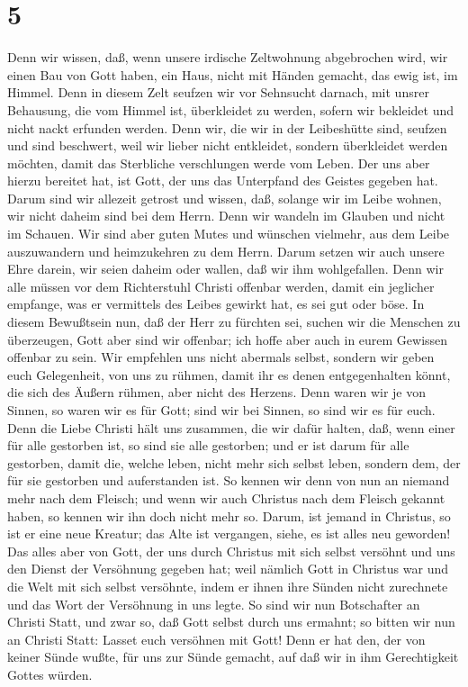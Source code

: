 \hypertarget{section-4}{%
\section{5}\label{section-4}}

 Denn wir wissen, daß, wenn unsere irdische Zeltwohnung
abgebrochen wird, wir einen Bau von Gott haben, ein Haus, nicht mit
Händen gemacht, das ewig ist, im Himmel.  Denn in diesem
Zelt seufzen wir vor Sehnsucht darnach, mit unsrer Behausung, die vom
Himmel ist, überkleidet zu werden,  sofern wir bekleidet
und nicht nackt erfunden werden.  Denn wir, die wir in der
Leibeshütte sind, seufzen und sind beschwert, weil wir lieber nicht
entkleidet, sondern überkleidet werden möchten, damit das Sterbliche
verschlungen werde vom Leben.  Der uns aber hierzu
bereitet hat, ist Gott, der uns das Unterpfand des Geistes gegeben hat.
 Darum sind wir allezeit getrost und wissen, daß, solange
wir im Leibe wohnen, wir nicht daheim sind bei dem Herrn. 
Denn wir wandeln im Glauben und nicht im Schauen.  Wir
sind aber guten Mutes und wünschen vielmehr, aus dem Leibe auszuwandern
und heimzukehren zu dem Herrn.  Darum setzen wir auch
unsere Ehre darein, wir seien daheim oder wallen, daß wir ihm
wohlgefallen.  Denn wir alle müssen vor dem Richterstuhl
Christi offenbar werden, damit ein jeglicher empfange, was er vermittels
des Leibes gewirkt hat, es sei gut oder böse.  In diesem
Bewußtsein nun, daß der Herr zu fürchten sei, suchen wir die Menschen zu
überzeugen, Gott aber sind wir offenbar; ich hoffe aber auch in eurem
Gewissen offenbar zu sein.  Wir empfehlen uns nicht
abermals selbst, sondern wir geben euch Gelegenheit, von uns zu rühmen,
damit ihr es denen entgegenhalten könnt, die sich des Äußern rühmen,
aber nicht des Herzens.  Denn waren wir je von Sinnen, so
waren wir es für Gott; sind wir bei Sinnen, so sind wir es für euch.
 Denn die Liebe Christi hält uns zusammen, die wir dafür
halten, daß, wenn einer für alle gestorben ist, so sind sie alle
gestorben;  und er ist darum für alle gestorben, damit
die, welche leben, nicht mehr sich selbst leben, sondern dem, der für
sie gestorben und auferstanden ist.  So kennen wir denn
von nun an niemand mehr nach dem Fleisch; und wenn wir auch Christus
nach dem Fleisch gekannt haben, so kennen wir ihn doch nicht mehr so.
 Darum, ist jemand in Christus, so ist er eine neue
Kreatur; das Alte ist vergangen, siehe, es ist alles neu geworden!
 Das alles aber von Gott, der uns durch Christus mit sich
selbst versöhnt und uns den Dienst der Versöhnung gegeben hat;
 weil nämlich Gott in Christus war und die Welt mit sich
selbst versöhnte, indem er ihnen ihre Sünden nicht zurechnete und das
Wort der Versöhnung in uns legte.  So sind wir nun
Botschafter an Christi Statt, und zwar so, daß Gott selbst durch uns
ermahnt; so bitten wir nun an Christi Statt: Lasset euch versöhnen mit
Gott!  Denn er hat den, der von keiner Sünde wußte, für
uns zur Sünde gemacht, auf daß wir in ihm Gerechtigkeit Gottes würden.

